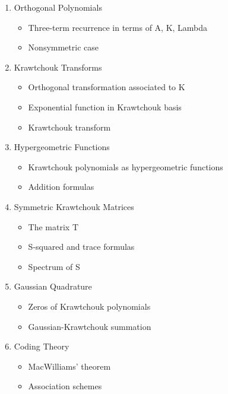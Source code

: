 \documentclass[12pt]{article}
\numberwithin{equation}{section}
\begin{document}
\begin{enumerate}
\item Orthogonal Polynomials   

\begin{itemize}
\item Three-term recurrence in terms of A, K, Lambda 
\item Nonsymmetric case 
 \end{itemize}

\item Krawtchouk Transforms   

 
\begin{itemize}
\item  Orthogonal transformation associated to K 
\item  Exponential function in Krawtchouk basis 
\item Krawtchouk transform
 \end{itemize}



\item Hypergeometric Functions  

 
\begin{itemize}
\item   Krawtchouk polynomials as hypergeometric functions 
\item  Addition formulas 
 \end{itemize}



\item Symmetric Krawtchouk Matrices  

 
\begin{itemize}
\item The matrix T 
\item  S-squared and trace formulas 
\item  Spectrum of S 
 \end{itemize}



\item Gaussian Quadrature  

   
\begin{itemize}
\item  Zeros of Krawtchouk polynomials 
\item  Gaussian-Krawtchouk summation 
 \end{itemize}

\item Coding Theory  

   
\begin{itemize}
\item  MacWilliams' theorem 
\item Association schemes 
 \end{itemize}


\end{enumerate}
\end{document}
